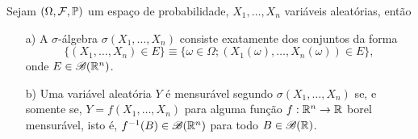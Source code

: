 





















\begin{teorema}\label{teo-f(X1,...,X_n)-sigma(X1,...,X_n)}
	Sejam $(\Omega,\mathcal{F},\mathbb{P})$ um espaço de probabilidade,
	$X_1,\ldots,X_n$ variáveis aleatórias, então 
\begin{itemize}
	\item[a)]
	A $\sigma$-álgebra $\sigma(X_1,\ldots,X_n)$ 
	consiste exatamente dos conjuntos da forma
	\[
		\{(X_1,\ldots,X_n)\in E\} 
		\equiv
		\{\omega\in\Omega; (X_1(\omega),\ldots,X_n(\omega))\in E\},
	\]
	onde $E\in \mathscr{B}(\mathbb{R}^n)$.
	
	\item[b)]
	Uma variável aleatória $Y$ é mensurável segundo 
	$\sigma(X_1,\ldots,X_n)$ se, e somente se,
	$Y=f(X_1,\ldots,X_n)$ para alguma função 
	$f:\mathbb{R}^n\to\mathbb{R}$ borel mensurável,
	isto é, $f^{-1}(B)\in\mathscr{B}(\mathbb{R}^n)$ para todo
	$B\in\mathscr{B}(\mathbb{R})$.
\end{itemize}
\end{teorema}


